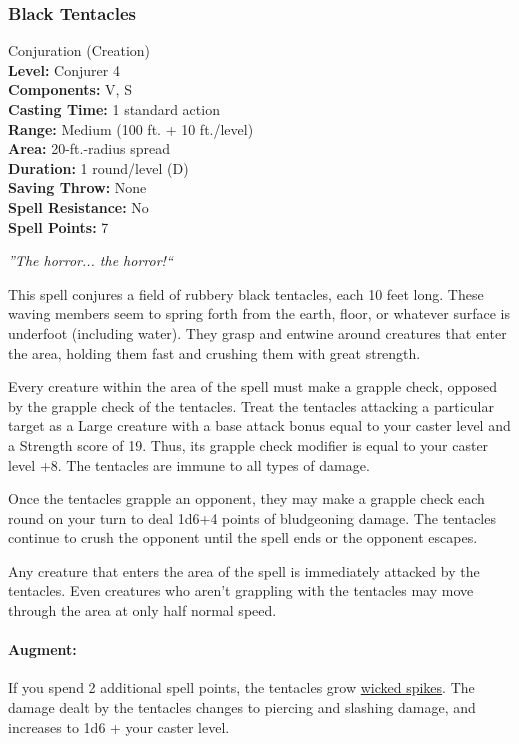 \subsubsection{Black Tentacles}
\label{Spell:BlackTentacles}
Conjuration (Creation)
\\ \textbf{Level:} Conjurer 4
\\ \textbf{Components:} V, S
\\ \textbf{Casting Time:} 1 standard action
\\ \textbf{Range:} Medium (100 ft. + 10 ft./level)
\\ \textbf{Area:} 20-ft.-radius spread
\\ \textbf{Duration:} 1 round/level (D)
\\ \textbf{Saving Throw:} None
\\ \textbf{Spell Resistance:} No
\\ \textbf{Spell Points:} 7

\emph{''The horror... the horror!``}

This spell conjures a field of rubbery black tentacles, each 10 feet long. 
These waving members seem to spring forth from the earth, floor, or whatever surface is underfoot (including water). 
They grasp and entwine around creatures that enter the area, holding them fast and crushing them with great strength.

Every creature within the area of the spell must make a grapple check, opposed by the grapple check of the tentacles. 
Treat the tentacles attacking a particular target as a Large creature with a base attack bonus equal to your caster level and a Strength score of 19. 
Thus, its grapple check modifier is equal to your caster level +8. 
The tentacles are immune to all types of damage.

Once the tentacles grapple an opponent, they may make a grapple check each round on your turn to deal 1d6+4 points of bludgeoning damage. 
The tentacles continue to crush the opponent until the spell ends or the opponent escapes.

Any creature that enters the area of the spell is immediately attacked by the tentacles. 
Even creatures who aren't grappling with the tentacles may move through the area at only half normal speed.

\paragraph{Augment:} 
If you spend 2 additional spell points, the tentacles grow
\href{http://www.giantitp.com/comics/oots0020.html}{wicked spikes}. 
The damage dealt by the tentacles changes to piercing and slashing damage, and increases to 1d6 + your caster level.

